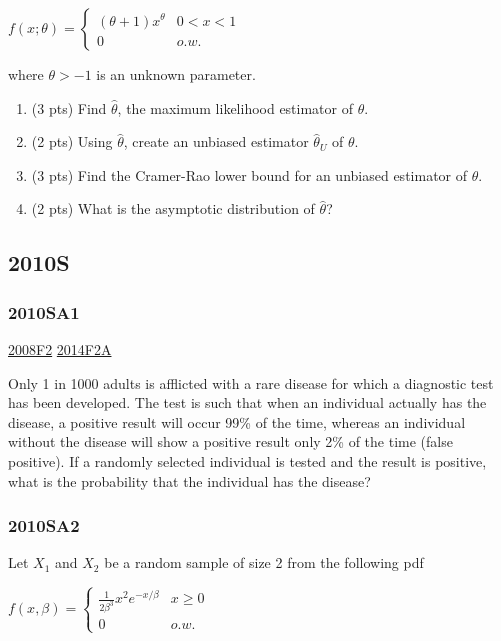 \documentclass[6pt,Portrait]{article}
\begin{document}
\(f(x;\theta)=\begin{cases}(\theta+1)x^\theta& 0<x<1\\0& o.w.\end{cases}\)

where \(\theta>-1\) is an unknown parameter.

\begin{enumerate}
\def\labelenumi{(\alph{enumi})}
\item
  (3 pts) Find \(\hat\theta\), the maximum likelihood estimator of
  \(\theta\).
\item
  (2 pts) Using \(\hat\theta\), create an unbiased estimator
  \(\hat\theta_U\) of \(\theta\).
\item
  (3 pts) Find the Cramer-Rao lower bound for an unbiased estimator of
  \(\theta\).
\item
  (2 pts) What is the asymptotic distribution of \(\hat\theta\)?
\end{enumerate}

\hypertarget{s-4}{%
\subsection{2010S}\label{s-4}}

\hypertarget{sa1-1}{%
\subsubsection{2010SA1}\label{sa1-1}}

\protect\hyperlink{f2-3}{2008F2} \protect\hyperlink{f2a-1}{2014F2A}

Only 1 in 1000 adults is afflicted with a rare disease for which a
diagnostic test has been developed. The test is such that when an
individual actually has the disease, a positive result will occur 99\%
of the time, whereas an individual without the disease will show a
positive result only 2\% of the time (false positive). If a randomly
selected individual is tested and the result is positive, what is the
probability that the individual has the disease?

\hypertarget{sa2-1}{%
\subsubsection{2010SA2}\label{sa2-1}}

Let \(X_1\) and \(X_2\) be a random sample of size 2 from the following
pdf

\(f(x,\beta)=\begin{cases} \frac1{2\beta^3}x^2e^{-x/\beta}& x\ge0\\0& o.w.\end{cases}\)
\end{document}
